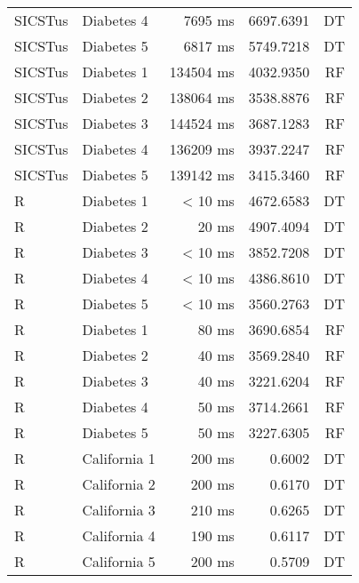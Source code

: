 \begin{longtable}{llrrr}
  SICSTus & Diabetes 4               & 7695 ms              &  6697.6391  & DT  \\
  SICSTus & Diabetes 5               & 6817 ms              &  5749.7218  & DT  \\
  \addlinespace
  SICSTus & Diabetes 1               & 134504 ms              &  4032.9350  & RF  \\
  SICSTus & Diabetes 2               & 138064 ms              &  3538.8876  & RF  \\
  SICSTus & Diabetes 3               & 144524 ms             &  3687.1283   & RF \\
  SICSTus & Diabetes 4               & 136209 ms              &  3937.2247  & RF  \\
  SICSTus & Diabetes 5               & 139142 ms              &  3415.3460  & RF  \\
  \addlinespace
  R & Diabetes 1               & < 10 ms               &  4672.6583 & DT   \\
  R & Diabetes 2               & 20 ms               &  4907.4094  & DT  \\
  R & Diabetes 3               & < 10 ms               &  3852.7208  & DT  \\
  R & Diabetes 4               & < 10 ms               &  4386.8610  & DT  \\
  R & Diabetes 5               & < 10 ms               &  3560.2763  & DT  \\
  \addlinespace
  R & Diabetes 1               & 80 ms               &  3690.6854  & RF  \\
  R & Diabetes 2               & 40 ms               &  3569.2840  & RF  \\
  R & Diabetes 3               & 40 ms               &  3221.6204  & RF  \\
  R & Diabetes 4               & 50 ms               &  3714.2661  & RF  \\
  R & Diabetes 5               & 50 ms               &  3227.6305  & RF  \\
  \addlinespace
  R & California 1               & 200 ms               &  0.6002  & DT   \\
  R & California 2               & 200 ms               &  0.6170  & DT  \\
  R & California 3               & 210 ms               &  0.6265  & DT  \\
  R & California 4               & 190 ms               &  0.6117  & DT  \\
  R & California 5               & 200 ms               &  0.5709   & DT \\

\end{longtable}
